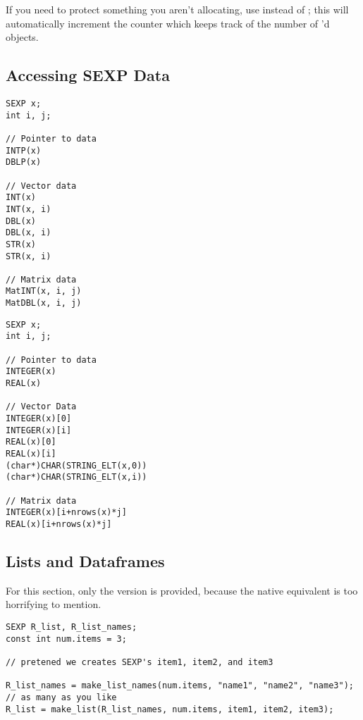 If you need to protect something you aren't allocating, use  instead 
of ; this will automatically increment the counter which keeps 
track of the number of 'd objects.



\subsection{Accessing SEXP Data}

\begin{center}
\begin{minipage}{.485\textwidth}\centering
\begin{lstlisting}[language=fanC,title=RNACI Data Accessors]
SEXP x;
int i, j;

// Pointer to data
INTP(x)
DBLP(x)

// Vector data
INT(x)
INT(x, i)
DBL(x)
DBL(x, i) 
STR(x)
STR(x, i)

// Matrix data
MatINT(x, i, j)
MatDBL(x, i, j) 
\end{lstlisting}
\end{minipage}
\hspace{.2cm}
\begin{minipage}{.485\textwidth}\centering
\begin{lstlisting}[language=fanC,title=Native Data Accessors]
SEXP x;
int i, j;

// Pointer to data
INTEGER(x)
REAL(x)

// Vector Data
INTEGER(x)[0]
INTEGER(x)[i]
REAL(x)[0]
REAL(x)[i]
(char*)CHAR(STRING_ELT(x,0))
(char*)CHAR(STRING_ELT(x,i))

// Matrix data
INTEGER(x)[i+nrows(x)*j]
REAL(x)[i+nrows(x)*j]
\end{lstlisting}
\end{minipage}
\end{center}



\subsection{Lists and Dataframes}

For this section, only the \thispackage version is provided, because the native 
equivalent is too horrifying to mention.
\begin{lstlisting}[language=fanC,title=Lists]
SEXP R_list, R_list_names;
const int num.items = 3;

// pretened we creates SEXP's item1, item2, and item3

R_list_names = make_list_names(num.items, "name1", "name2", "name3"); // as many as you like
R_list = make_list(R_list_names, num.items, item1, item2, item3);
\end{lstlisting}

